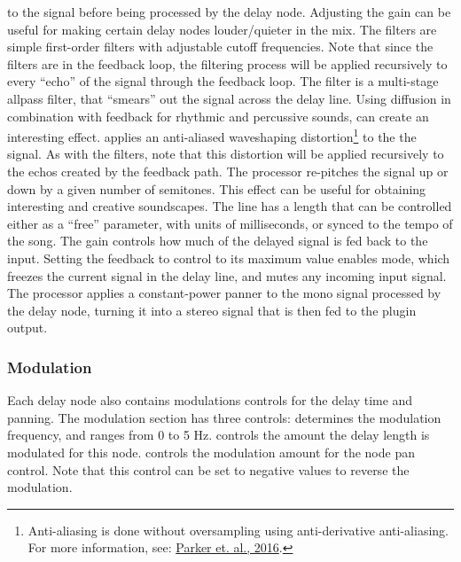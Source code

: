 \documentclass[landscape,twocolumn,a5paper]{manual}
\begin{document}
to the signal before being processed by the delay
node. Adjusting the gain can be useful for making
certain delay nodes louder/quieter in the mix.
\newpar
The  filters are simple
first-order filters with adjustable cutoff frequencies.
Note that since the filters are in the feedback loop,
the filtering process will be applied recursively to every
``echo'' of the signal through the feedback loop.
\newpar
The  filter is a multi-stage allpass
filter, that ``smears'' out the signal across the delay line.
Using diffusion in combination with feedback for rhythmic
and percussive sounds, can create an interesting effect.
\newpar
{} applies an anti-aliased waveshaping
distortion\footnote{Anti-aliasing is done without oversampling using anti-derivative anti-aliasing. For more information, see: \href{http://dafx16.vutbr.cz/dafxpapers/20-DAFx-16_paper_41-PN.pdf}{Parker et. al., 2016}.}
to the the signal. As with the filters, note that this
distortion will be applied recursively to the echos created
by the feedback path.
\newpar
The  processor re-pitches the signal up
or down by a given number of semitones. This effect can be
useful for obtaining interesting and creative soundscapes.
\newpar
The  line has a length that can be
controlled either as a ``free'' parameter, with units
of milliseconds, or synced to the tempo of the song.
\newpar
The  gain controls how much of the
delayed signal is fed back to the input.
Setting the feedback to control to its maximum value
enables  mode, which freezes the
current signal in the delay line, and mutes any incoming
input signal.
\newpar
The  processor applies a constant-power
panner to the mono signal processed by the delay node,
turning it into a stereo signal that is then fed to the
plugin output.

\subsubsection{Modulation}
Each delay node also contains modulations controls for the
delay time and panning. The modulation section has three
controls:
\newpar
{} determines the modulation frequency,
and ranges from 0 to 5 Hz.
 controls the amount the delay length
is modulated for this node.
 controls the modulation amount for
the node pan control. Note that this control can be
set to negative values to reverse the modulation.
\end{document}
